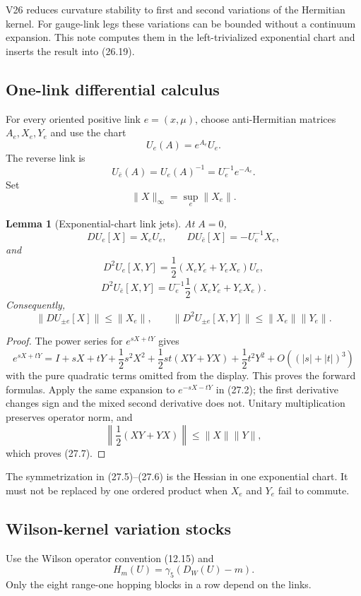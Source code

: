 \documentclass[11pt]{article}
\newtheorem{lemma}[theorem]{Lemma}
\begin{document}
V26 reduces curvature stability to first and second variations of the
Hermitian kernel.  For gauge-link legs these variations can be bounded
without a continuum expansion.  This note computes them in the
left-trivialized exponential chart and inserts the result into (26.19).

\subsection{One-link differential calculus}

For every oriented positive link \(e=(x,\mu)\), choose anti-Hermitian
matrices \(A_e,X_e,Y_e\) and use the chart
\[
 U_e(A)=e^{A_e}U_e.
 \tag{27.1}
\]
The reverse link is
\[
 U_{\bar e}(A)=U_e(A)^{-1}=U_e^{-1}e^{-A_e}.
 \tag{27.2}
\]
Set
\[
 \|X\|_\infty=\sup_e\|X_e\|.
 \tag{27.3}
\]

\begin{lemma}[Exponential-chart link jets]
\label{lem:v11v27-link-jets}
At \(A=0\),
\[
 D U_e[X]=X_eU_e,\qquad
 D U_{\bar e}[X]=-U_e^{-1}X_e,
 \tag{27.4}
\]
and
\[
 D^2U_e[X,Y]
 =\frac12(X_eY_e+Y_eX_e)U_e,
 \tag{27.5}
\]
\[
 D^2U_{\bar e}[X,Y]
 =U_e^{-1}\frac12(X_eY_e+Y_eX_e).
 \tag{27.6}
\]
Consequently,
\[
 \|D U_{\pm e}[X]\|\leq\|X_e\|,
 \qquad
 \|D^2U_{\pm e}[X,Y]\|
 \leq\|X_e\|\|Y_e\|.
 \tag{27.7}
\]
\end{lemma}

\begin{proof}
The power series for \(e^{sX+tY}\) gives
\[
 e^{sX+tY}
 =
 I+sX+tY+\frac12s^2X^2+\frac12st(XY+YX)+\frac12t^2Y^2+O((|s|+|t|)^3)
\]
with the pure quadratic terms omitted from the display.  This proves
the forward formulas.  Apply the same expansion to
\(e^{-sX-tY}\) in (27.2); the first derivative changes sign and the
mixed second derivative does not.  Unitary multiplication preserves
operator norm, and
\[
 \left\|\frac12(XY+YX)\right\|
 \leq\|X\|\|Y\|,
\]
which proves (27.7).
\end{proof}

The symmetrization in (27.5)--(27.6) is the Hessian in one exponential
chart.  It must not be replaced by one ordered product when \(X_e\) and
\(Y_e\) fail to commute.

\subsection{Wilson-kernel variation stocks}

Use the Wilson operator convention (12.15) and
\[
 H_m(U)=\gamma_5(D_W(U)-m).
 \tag{27.8}
\]
Only the eight range-one hopping blocks in a row depend on the links.
\end{document}
